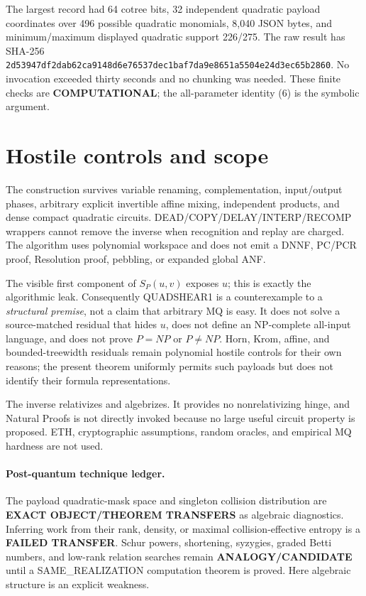 \documentclass[11pt]{article}
\newcommand{\COMP}{\textbf{COMPUTATIONAL}}
\begin{document}
The largest record had 64 cotree bits, 32 independent quadratic payload
coordinates over 496 possible quadratic monomials, 8,040 JSON bytes, and
minimum/maximum displayed quadratic support 226/275.  The raw result
has SHA-256
\texttt{2d53947df2dab62ca9148d6e76537dec1baf7da9e8651a5504e24d3ec65b2860}.
No invocation exceeded thirty seconds and no chunking was needed.  These
finite checks are \COMP{}; the all-parameter identity (6) is the symbolic
argument.

\section{Hostile controls and scope}
The construction survives variable renaming, complementation, input/output
phases, arbitrary explicit invertible affine mixing, independent products,
and dense compact quadratic circuits.  DEAD/COPY/DELAY/INTERP/RECOMP wrappers
cannot remove the inverse when recognition and replay are charged.  The
algorithm uses polynomial workspace and does not emit a DNNF, PC/PCR proof,
Resolution proof, pebbling, or expanded global ANF.

The visible first component of $S_P(u,v)$ exposes $u$; this is exactly the
algorithmic leak.  Consequently QUADSHEAR1 is a counterexample to a
\emph{structural premise}, not a claim that arbitrary MQ is easy.  It does
not solve a source-matched residual that hides $u$, does not define an
NP-complete all-input language, and does not prove $P=NP$ or $P\ne NP$.
Horn, Krom, affine, and bounded-treewidth residuals remain polynomial hostile
controls for their own reasons; the present theorem uniformly permits such
payloads but does not identify their formula representations.

The inverse relativizes and algebrizes.  It provides no nonrelativizing
hinge, and Natural Proofs is not directly invoked because no large useful
circuit property is proposed.  ETH, cryptographic assumptions, random
oracles, and empirical MQ hardness are not used.

\paragraph{Post-quantum technique ledger.}
The payload quadratic-mask space and singleton collision distribution are
\textbf{EXACT OBJECT/THEOREM TRANSFERS} as algebraic diagnostics.  Inferring
work from their rank, density, or maximal collision-effective entropy is a
\textbf{FAILED TRANSFER}.  Schur powers, shortening, syzygies, graded Betti
numbers, and low-rank relation searches remain \textbf{ANALOGY/CANDIDATE}
until a SAME\_REALIZATION computation theorem is proved.  Here algebraic
structure is an explicit weakness.
\end{document}
